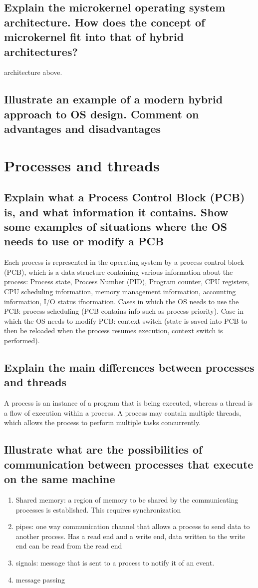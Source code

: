 \documentclass{article}
\begin{document}
\subsection{Explain the microkernel operating system architecture. How does the concept of microkernel fit into that of hybrid architectures?}
architecture above. 
\subsection{Illustrate an example of a modern hybrid approach to OS design. Comment on advantages and disadvantages}




\section{Processes and threads}

\subsection{Explain what a Process Control Block (PCB) is, and what information it contains. Show some examples of situations where the OS needs to use or modify a PCB}
Each process is represented in the operating system by a process control block (PCB), which is a data structure containing various information about the process: Process state, Process Number (PID), Program counter, CPU registers, CPU scheduling information, memory management information, accounting information, I/O status ifnormation. Cases in which the OS needs to use the PCB: process scheduling (PCB contains info such as process priority). Case in which the OS needs to modify PCB: context switch (state is saved into PCB to then be reloaded when the process resumes execution, context switch is performed).

\subsection{Explain the main differences between processes and threads}
A process is an instance of a program that is being executed, whereas a thread is a flow of execution within a process. A process may contain multiple threads, which allows the process to perform multiple tasks concurrently.

\subsection{Illustrate what are the possibilities of communication between processes that execute on the same machine}
\begin{enumerate}
    \item Shared memory: a region of memory to be shared by the communicating processes is established. This requires synchronization
    \item pipes: one way communication channel that allows a process to send data to another process. Has a read end and a write end, data written to the write end can be read from the read end
    \item signals: message that is sent to a process to notify it of an event.
    \item message passing
\end{enumerate}
\end{document}
